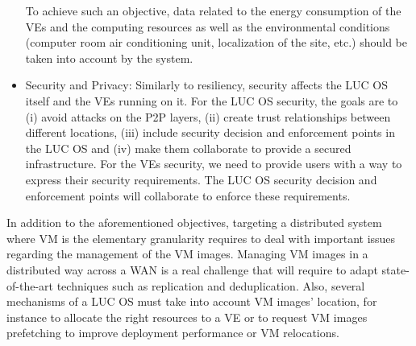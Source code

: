 \documentclass[11pt,a4paper,twoside]{article}
\newcommand{\discovery}{DISCOVERY\xspace}
\begin{document}
\begin{itemize}
 To achieve such an objective, data related to the energy
  consumption of the VEs  and the computing resources
  as well as the environmental conditions (computer room air conditioning unit, localization of the
  site, etc.) should be taken into account by the system.
\item Security and Privacy: Similarly to resiliency, security affects the LUC OS itself and the VEs running on it.
For the LUC OS security, the goals are to (i) avoid attacks on the P2P layers, (ii) create trust relationships between different locations, 
(iii) include security decision and enforcement points in the LUC OS and (iv) make them collaborate to provide a secured infrastructure.
For the VEs security, we need to provide users with a way to express their security requirements. The LUC OS security decision and enforcement points will collaborate to enforce these requirements.
\end{itemize}

In addition to the aforementioned objectives, targeting a distributed system
where VM is the elementary granularity requires to deal with important issues
regarding the management of the VM images. Managing VM images in a distributed
way across a WAN is a real challenge that will require to adapt
state-of-the-art techniques such as replication and deduplication. Also,
several mechanisms of a LUC OS must take into account VM images'
location, for instance to allocate the right resources to a VE  or to request
VM images prefetching to improve deployment performance or VM relocations.
\end{document}
